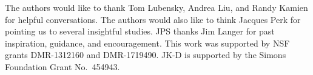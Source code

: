 \documentclass[
aps,
pre,
preprint,
longbibliography,
floatfix
]{revtex4-2}
\begin{document}
\begin{acknowledgments}
  The authors would like to thank Tom Lubensky, Andrea Liu, and Randy Kamien
  for helpful conversations. The authors would also like to think Jacques Perk
  for pointing us to several insightful studies. JPS thanks Jim Langer for past
  inspiration, guidance, and encouragement. This work was supported by NSF
  grants DMR-1312160 and DMR-1719490. JK-D is supported by the Simons
  Foundation Grant No.~454943.
\end{acknowledgments}


\end{document}
